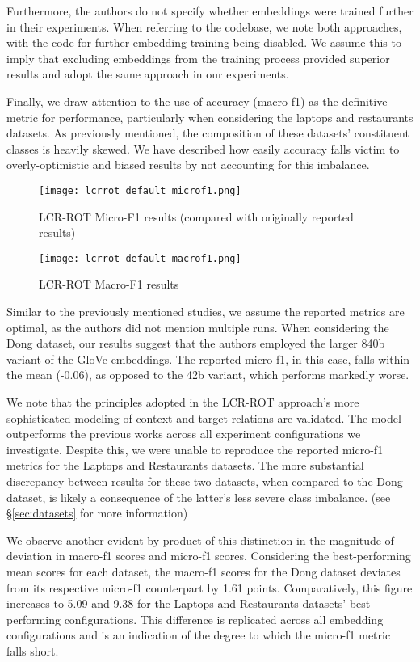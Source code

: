 \documentclass[../../fyp.tex]{subfiles}
\begin{document}
Furthermore, the authors do not specify whether embeddings were trained further in their experiments. When referring to the codebase, we note both approaches, with the code for further embedding training being disabled. We assume this to imply that excluding embeddings from the training process provided superior results and adopt the same approach in our experiments. 

Finally, we draw attention to the use of accuracy (macro-f1) as the definitive metric for performance, particularly when considering the laptops and restaurants datasets. As previously mentioned, the composition of these datasets' constituent classes is heavily skewed. We have described how easily accuracy falls victim to overly-optimistic and biased results by not accounting for this imbalance.   

\begin{figure}[!ht]
	\centering
	\texttt{[image: lcrrot\_default\_microf1.png]}
	\caption{LCR-ROT Micro-F1 results (compared with originally reported results)}
	\label{fig:ffnn}
\end{figure}

\begin{figure}[!ht]
	\centering
	\texttt{[image: lcrrot\_default\_macrof1.png]}
	\caption{LCR-ROT Macro-F1 results}
	\label{fig:ffnn}
\end{figure}

Similar to the previously mentioned studies, we assume the reported metrics are optimal, as the authors did not mention multiple runs. When considering the Dong dataset, our results suggest that the authors employed the larger 840b variant of the GloVe embeddings. The reported micro-f1, in this case, falls within the mean (-0.06), as opposed to the 42b variant, which performs markedly worse. 

We note that the principles adopted in the LCR-ROT approach's more sophisticated modeling of context and target relations are validated. The model outperforms the previous works across all experiment configurations we investigate. Despite this, we were unable to reproduce the reported micro-f1 metrics for the Laptops and Restaurants datasets. The more substantial discrepancy between results for these two datasets, when compared to the Dong dataset, is likely a consequence of the latter's less severe class imbalance. (see \S\ref{sec:datasets} for more information) 

We observe another evident by-product of this distinction in the magnitude of deviation in macro-f1 scores and micro-f1 scores. Considering the best-performing mean scores for each dataset, the macro-f1 scores for the Dong dataset deviates from its respective micro-f1 counterpart by 1.61 points. Comparatively, this figure increases to 5.09 and 9.38 for the Laptops and Restaurants datasets' best-performing configurations. This difference is replicated across all embedding configurations and is an indication of the degree to which the micro-f1 metric falls short.
\end{document}
